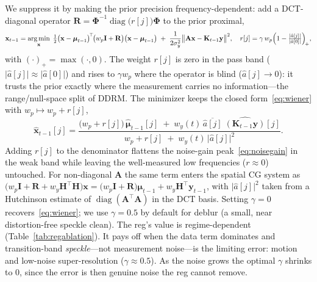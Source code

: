\documentclass[11pt]{article}
\newcommand{\bm}[1]{\boldsymbol{#1}}  %
\newcommand{\Phimat}{\bm{\Phi}}
\newcommand{\A}{\mathbf{A}}
\newcommand{\K}{\mathbf{K}}
\newcommand{\x}{\mathbf{x}}
\newcommand{\y}{\mathbf{y}}
\newcommand{\bmu}{\bm{\mu}}
\newcommand{\I}{\mathbf{I}}
\DeclareMathOperator*{\argmin}{arg\,min}
\begin{document}
We suppress it by making the prior precision frequency-dependent: add a DCT-diagonal operator
$\mathbf R=\Phimat^{-1}\operatorname{diag}\!\bigl(r[j]\bigr)\Phimat$ to the prior proximal,
\begin{equation}
\x_{t-1}=\argmin_{\x}\;\tfrac12\bigl(\x-\bmu_{t-1}\bigr)^{\!\top}\!\bigl(w_p\I+\mathbf R\bigr)\bigl(\x-\bmu_{t-1}\bigr)
\;+\;\frac{1}{2\sigma_y^2}\bigl\|\A\x-\K_{t-1}\y\bigr\|^{2},
\quad
r[j]=\gamma\,w_p\Bigl(1-\tfrac{\lvert\hat a[j]\rvert}{\lvert\hat a[0]\rvert}\Bigr)_{\!+},
\label{eq:reg}
\end{equation}
with $(\cdot)_+=\max(\cdot,0)$. The weight $r[j]$ is zero in the pass band
($\lvert\hat a[j]\rvert\!\approx\!\lvert\hat a[0]\rvert$) and rises to $\gamma w_p$ where the operator
is blind ($\hat a[j]\!\to\!0$): it trusts the prior exactly where the measurement carries no
information---the range/null-space split of DDRM. The minimizer keeps the closed
form~\eqref{eq:wiener} with $w_p\!\mapsto\!w_p+r[j]$,
\begin{equation}
\boxed{\;
\hat{\x}_{t-1}[j]
=\frac{\bigl(w_p+r[j]\bigr)\,\hat{\bmu}_{t-1}[j]\;+\;w_y(t)\,\overline{\hat a[j]}\;\widehat{(\K_{t-1}\y)}[j]}
       {w_p+r[j]\;+\;w_y(t)\,\lvert\hat a[j]\rvert^{2}} .
\;}
\label{eq:wienerreg}
\end{equation}
Adding $r[j]$ to the denominator flattens the noise-gain peak~\eqref{eq:noisegain} in the weak band
while leaving the well-measured low frequencies ($r\!\approx\!0$) untouched. For non-diagonal $\A$
the same term enters the spatial CG system as
$\bigl(w_p\I+\mathbf R+w_y\mathbf H^{\!\top}\mathbf H\bigr)\x=\bigl(w_p\I+\mathbf R\bigr)\bmu_{t-1}+w_y\mathbf H^{\!\top}\y_{t-1}$,
with $\lvert\hat a[j]\rvert^{2}$ taken from a Hutchinson estimate of
$\operatorname{diag}(\A^{\!\top}\A)$ in the DCT basis. Setting $\gamma\!=\!0$
recovers~\eqref{eq:wiener}; we use $\gamma\!=\!0.5$ by default for deblur (a small, near
distortion-free speckle clean). The reg's value is regime-dependent (Table~\ref{tab:regablation}).
It pays off when the data term dominates and transition-band \emph{speckle}---not measurement
noise---is the limiting error: motion and low-noise super-resolution ($\gamma\!\approx\!0.5$). As the
noise grows the optimal $\gamma$ shrinks to $0$, since the error is then genuine noise the reg cannot
remove.
\end{document}
